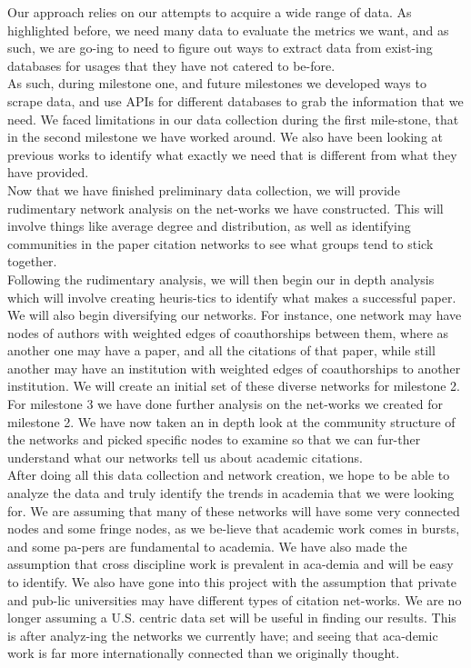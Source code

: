\documentclass[times, 10pt,twocolumn]{article}
\begin{document}
Our approach relies on our attempts to acquire a wide range of data. As highlighted before, we need many data to evaluate the metrics we want, and as such, we are go-ing to need to figure out ways to extract data from exist-ing databases for usages that they have not catered to be-fore.\\
As such, during milestone one, and future milestones we developed ways to scrape data, and use APIs for different databases to grab the information that we need. We faced limitations in our data collection during the first mile-stone, that in the second milestone we have worked around. We also have been looking at previous works to identify what exactly we need that is different from what they have provided. \\
Now that we have finished preliminary data collection, we will provide rudimentary network analysis on the net-works we have constructed. This will involve things like average degree and distribution, as well as identifying communities in the paper citation networks to see what groups tend to stick together. \\
Following the rudimentary analysis, we will then begin our in depth analysis which will involve creating heuris-tics to identify what makes a successful paper. We will also begin diversifying our networks. For instance, one network may have nodes of authors with weighted edges of coauthorships between them, where as another one may have a paper, and all the citations of that paper, while still another may have an institution with weighted edges of coauthorships to another institution. We will create an initial set of these diverse networks for milestone 2.\\
For milestone 3 we have done further analysis on the net-works we created for milestone 2. We have now taken an in depth look at the community structure of the networks and picked specific nodes to examine so that we can fur-ther understand what our networks tell us about academic citations. \\
After doing all this data collection and network creation, we hope to be able to analyze the data and truly identify the trends in academia that we were looking for. We are assuming that many of these networks will have some very connected nodes and some fringe nodes, as we be-lieve that academic work comes in bursts, and some pa-pers are fundamental to academia. We have also made the assumption that cross discipline work is prevalent in aca-demia and will be easy to identify. We also have gone into this project with the assumption that private and pub-lic universities may have different types of citation net-works. We are no longer assuming a U.S. centric data set will be useful in finding our results. This is after analyz-ing the networks we currently have; and seeing that aca-demic work is far more internationally connected than we originally thought.
\end{document}
